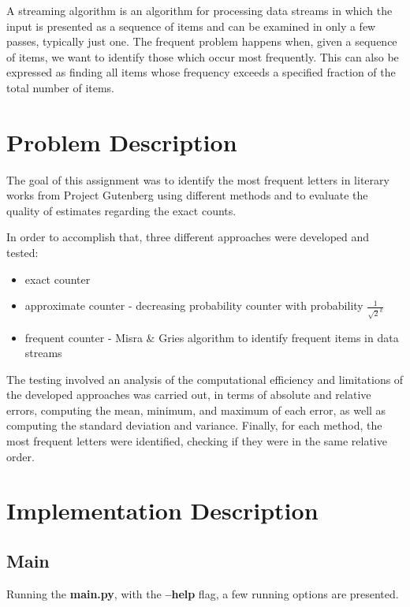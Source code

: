 \documentclass[...]{revdetua}
\begin{document}
A streaming algorithm is an algorithm for processing data streams in which the input is presented as a sequence of items and can be examined in only a few passes, typically just one.
The frequent problem happens when, given a sequence of items, we want to identify those which occur most frequently. This can also be expressed as finding all items whose frequency exceeds a specified fraction of the total number of items.

\section{Problem Description}

The  goal of this assignment was to identify the most frequent letters in literary works from Project Gutenberg\cite{project} using different methods and to evaluate the quality of estimates regarding the exact counts.

In order to accomplish that, three different approaches were developed and tested:
\begin{itemize}
    \item exact counter
    \item approximate counter - decreasing probability counter with probability \(\frac{1}{\sqrt{2}^k}\)
    \item frequent counter - Misra \& Gries algorithm to identify frequent items in data streams
\end{itemize} 

The testing involved an analysis of the computational efficiency and limitations of the developed approaches was carried out, in terms of absolute and relative errors, computing the mean, minimum, and maximum of each error, as well as computing the standard deviation and variance.
Finally, for each method, the most frequent letters were identified, checking if they were in the same relative order.

\section{Implementation Description}

\subsection{Main}

Running the \textbf{main.py}, with the \textbf{--help} flag, a few running options are presented.
\end{document}
